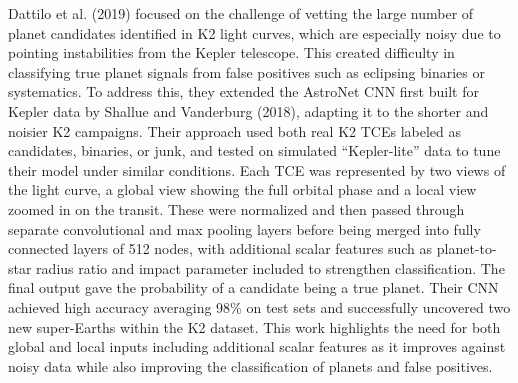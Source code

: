 \documentclass[letterpaper]{article}
\begin{document}
Dattilo et al. (2019) focused on the challenge of vetting the large number of planet candidates identified in K2 light curves, which are especially noisy due to pointing instabilities from the Kepler telescope. This created difficulty in classifying true planet signals from false positives such as eclipsing binaries or systematics. To address this, they extended the AstroNet CNN first built for Kepler data by Shallue and Vanderburg (2018), adapting it to the shorter and noisier K2 campaigns. Their approach used both real K2 TCEs labeled as candidates, binaries, or junk, and tested on simulated ``Kepler-lite'' data to tune their model under similar conditions. Each TCE was represented by two views of the light curve, a global view showing the full orbital phase and a local view zoomed in on the transit. These were normalized and then passed through separate convolutional and max pooling layers before being merged into fully connected layers of 512 nodes, with additional scalar features such as planet-to-star radius ratio and impact parameter included to strengthen classification. The final output gave the probability of a candidate being a true planet. Their CNN achieved high accuracy averaging 98\% on test sets and successfully uncovered two new super-Earths within the K2 dataset. This work highlights the need for both global and local inputs including additional scalar features as it improves against noisy data while also improving the classification of planets and false positives.
\end{document}
